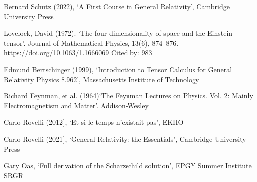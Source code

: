 \documentclass[11pt]{article}
\begin{document}
 \begin{thebibliography}{}
 
 Bernard Schutz (2022), `A First Course in General Relativity', Cambridge University Press

Lovelock, David (1972). `The four-dimensionality of space and the Einstein tensor'. Journal of Mathematical Physics, 13(6), 874–876. https://doi.org/10.1063/1.1666069
Cited by: 983
 
 Edmund Bertschinger (1999), `Introduction to Tensor Calculus for General Relativity Physics 8.962', Massachusetts Institute of Technology

 Richard Feynman, et al. (1964)`The Feynman Lectures on Physics. Vol. 2: Mainly Electromagnetism and Matter'. Addison‑Wesley

 Carlo Rovelli (2012), `Et si le temps n'existait pas', EKHO

 Carlo Rovelli (2021), `General Relativity: the Essentials', Cambridge University Press

 Gary Oas, `Full derivation of the Scharzschild solution', EPGY Summer Institute SRGR 
 


\end{thebibliography}
\end{document}
